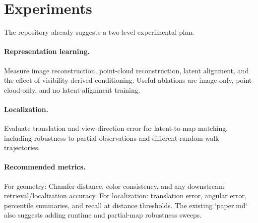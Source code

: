 \section{Experiments}

The repository already suggests a two-level experimental plan.

\paragraph{Representation learning.}
Measure image reconstruction, point-cloud reconstruction, latent alignment, and the effect of visibility-derived conditioning. Useful ablations are image-only, point-cloud-only, and no latent-alignment training.

\paragraph{Localization.}
Evaluate translation and view-direction error for latent-to-map matching, including robustness to partial observations and different random-walk trajectories.

\paragraph{Recommended metrics.}
For geometry: Chamfer distance, color consistency, and any downstream retrieval/localization accuracy. For localization: translation error, angular error, percentile summaries, and recall at distance thresholds. The existing `paper.md` also suggests adding runtime and partial-map robustness sweeps.
